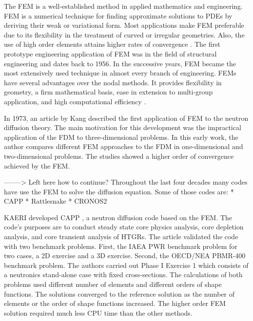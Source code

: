 \documentclass[11pt,letterpaper]{article}
\begin{document}
The \gls{FEM} is a well-established method in applied mathematics and engineering.
\gls{FEM} is a numerical technique for finding approximate solutions to \glspl{PDE} by deriving their weak or variational form.
Most applications make \gls{FEM} preferable due to its flexibility in the treatment of curved or irregular geometries.
Also, the use of high order elements attains higher rates of convergence \cite{cavdar_finite_2004}.
The first prototype engineering application of \gls{FEM} was in the field of structural engineering and dates back to 1956.
In the successive years, \gls{FEM} became the most extensively used technique in almost every branch of engineering.
\glspl{FEM} have several advantages over the nodal methods.
It provides flexibility in geometry, a firm mathematical basis, ease in extension to multi-group application, and high computational efficiency \cite{lee_development_2008}.

In 1973, an article by Kang \cite{kang_finite_1973} described the first application of \gls{FEM} to the neutron diffusion theory.
The main motivation for this development was the impractical application of the \gls{FDM} to three-dimensional problems.
In this early work, the author compares different \gls{FEM} approaches to the \gls{FDM} in one-dimensional and two-dimensional problems.
The studies showed a higher order of convergence achieved by the \gls{FEM}.



--------> Left here
how to continue?
Throughout the last four decades many codes have use the \gls{FEM} to solve the diffusion equation.
Some of those codes are:
* CAPP \cite{lee_development_2011}
* Rattlesnake \cite{wang_rattlesnake_2019}
* CRONOS2




\gls{KAERI} developed CAPP \cite{lee_development_2008}, a neutron diffusion code based on the \gls{FEM}.
The code's purposes are to conduct steady state core physics analysis, core depletion analysis, and core transient analysis of \glspl{HTGR}.
The article validated the code with two benchmark problems.
First, the IAEA PWR benchmark problem for two cases, a 2D exercise and a 3D exercise.
Second, the OECD/NEA PBMR-400 benchmark problem.
The authors carried out Phase I Exercise 1 which consists of a neutronics stand-alone case with fixed cross-sections.
The calculations of both problems used different number of elements and different orders of shape functions.
The solutions converged to the reference solution as the number of elements or the order of shape functions increased.
The higher order \gls{FEM} solution required much less CPU time than the other methods.
\end{document}
